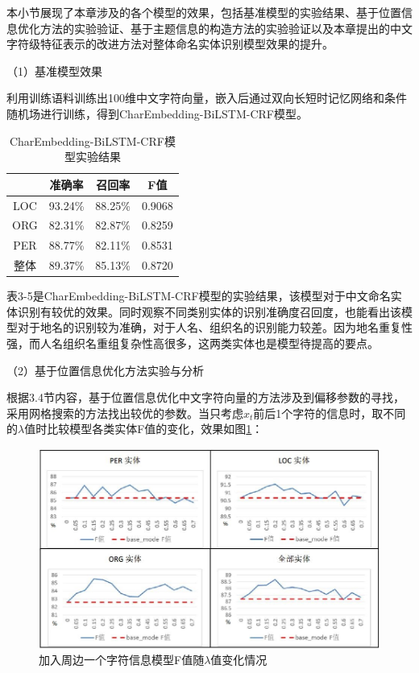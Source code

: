 \documentclass[winfonts,master,oneside,nobackinfo]{njuthesis}
\begin{document}
本小节展现了本章涉及的各个模型的效果，包括基准模型的实验结果、基于位置信息优化方法的实验验证、基于主题信息的构造方法的实验验证以及本章提出的中文字符级特征表示的改进方法对整体命名实体识别模型效果的提升。

（1）基准模型效果

利用训练语料训练出100维中文字符向量，嵌入后通过双向长短时记忆网络和条件随机场进行训练，得到CharEmbedding-BiLSTM-CRF模型。

\begin{table}[h]
\centering
\begin{tabular}{|c|c|c|c|}
\hline
    & 准确率     & 召回率     & F值    \\ \hline
LOC & 93.24\% & 88.25\% & 0.9068 \\ \hline
ORG & 82.31\% & 82.87\% & 0.8259 \\ \hline
PER & 88.77\% & 82.11\% & 0.8531 \\ \hline
整体  & 89.37\% & 85.13\% & 0.8720 \\ \hline
\end{tabular}
\caption{CharEmbedding-BiLSTM-CRF模型实验结果}
\end{table}

表3-5是CharEmbedding-BiLSTM-CRF模型的实验结果，该模型对于中文命名实体识别有较优的效果。同时观察不同类别实体的识别准确度召回度，也能看出该模型对于地名的识别较为准确，对于人名、组织名的识别能力较差。因为地名重复性强，而人名组织名重组复杂性高很多，这两类实体也是模型待提高的要点。

（2）基于位置信息优化方法实验与分析

根据3.4节内容，基于位置信息优化中文字符向量的方法涉及到偏移参数的寻找，采用网格搜索的方法找出较优的参数。当只考虑$x_{t}$前后1个字符的信息时，取不同的$\lambda$值时比较模型各类实体F值的变化，效果如图\ref{k=1}：

\begin{figure}[h]
\centering
\includegraphics[width=1\textwidth]{./figure/参数1.jpg}
\caption{加入周边一个字符信息模型F值随$\lambda$值变化情况}
\label{k=1}
\end{figure}
\end{document}
